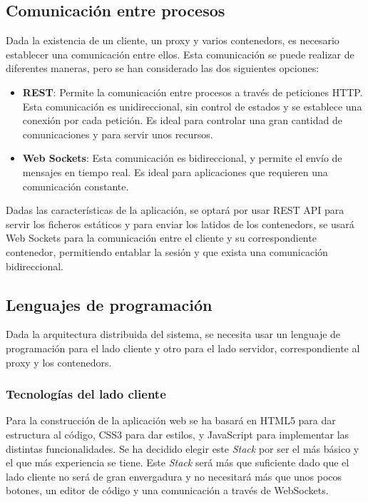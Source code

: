 \subsection{Comunicación entre procesos} \label{subsec:comunicacion-procesos}

Dada la existencia de un cliente, un \gls{proxy} y varios \glspl{contenedor}, es necesario establecer una comunicación entre ellos. Esta comunicación se puede realizar de diferentes maneras, pero se han considerado las dos siguientes opciones: 

\begin{itemize}
    \item \textbf{REST}: Permite la comunicación entre \glspl{proceso} a través de peticiones \gls{HTTP}. Esta comunicación es unidireccional, sin control de estados y se establece una conexión por cada petición. Es ideal para controlar una gran cantidad de comunicaciones y para servir unos recursos.
    \item \textbf{Web Sockets}: Esta comunicación es bidireccional, y permite el envío de mensajes en tiempo real. Es ideal para aplicaciones que requieren una comunicación constante.
\end{itemize}

Dadas las características de la aplicación, se optará por usar \gls{REST API} para servir los ficheros estáticos y para enviar los latidos de los \glspl{contenedor}, se usará Web Sockets para la comunicación entre el cliente y su correspondiente \gls{contenedor}, permitiendo entablar la sesión y que exista una comunicación bidireccional.

\subsection{Lenguajes de programación} \label{subsec:programacion}

Dada la arquitectura distribuida del sistema, se necesita usar un lenguaje de programación para el lado cliente y otro para el lado servidor, correspondiente al \gls{proxy} y los \glspl{contenedor}.

\subsubsection{Tecnologías del lado cliente} \label{subsubsec:tecnologias-cliente}

Para la construcción de la aplicación web se ha basará en HTML5 para dar estructura al código, CSS3 para dar estilos, y JavaScript para implementar las distintas funcionalidades. Se ha decidido elegir este \textit{Stack} por ser el más básico y el que más experiencia se tiene. Este \textit{Stack} será más que suficiente dado que el lado cliente no será de gran envergadura y no necesitará más que unos pocos botones, un editor de código y una comunicación a través de WebSockets.



